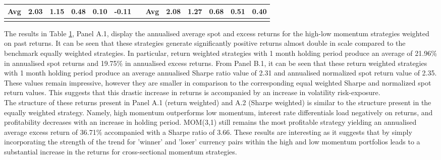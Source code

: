 \documentclass{article}
\begin{document}
\begin{table}[htbp!]
\begin{adjustwidth}{-2cm}{}
\begin{tabular}{ccccccccccccc}
\cmidrule{2-6}\cmidrule{9-13}    \textbf{Avg} & \multicolumn{1}{l}{2.03} & \multicolumn{1}{l}{1.15} & \multicolumn{1}{l}{0.48} & \multicolumn{1}{l}{0.10} & \multicolumn{1}{l}{-0.11} &       & \textbf{Avg} & \multicolumn{1}{l}{2.08} & \multicolumn{1}{l}{1.27} & \multicolumn{1}{l}{0.68} & \multicolumn{1}{l}{0.51} & \multicolumn{1}{l}{0.40} \\
    \midrule
          &       &       &       &       &       &       &       &       &       &       &       &  \\
    \end{tabular}%
    \end{adjustwidth}
  \label{WMR}%
\end{table}%

The results in Table \ref{WMR}, Panel A.1, display the annualised average spot and excess returns for the high-low momentum strategies weighted on past returns. It can be seen that these strategies generate significantly positive returns almost double in scale compared to the benchmark equally weighted strategies. In particular, return weighted strategies with 1 month holding period produce an average of 21.96\% in annualised spot returns and 19.75\% in annualised excess returns. From Panel B.1, it can be seen that these return weighted strategies with 1 month holding period produce an average annualised Sharpe ratio value of 2.31 and annualised normalized spot return value of 2.35. These values remain impressive, however they are smaller in comparison to the corresponding equal weighted Sharpe and normalized spot return values. This suggests that this drastic increase in returns is accompanied by an increase in volatility risk-exposure.\\

The structure of these returns present in Panel A.1 (return weighted) and A.2 (Sharpe weighted) is similar to the structure present in the equally weighted strategy. Namely, high momentum outperforms low momentum, interest rate differentials load negatively on returns, and profitability decreases with an increase in holding period. MOM(3,1) still remains the most profitable strategy yielding an annualised average excess return of 36.71\% accompanied with a Sharpe ratio of 3.66. These results are interesting as it suggests that by simply incorporating the strength of the trend for 'winner' and 'loser' currency pairs within the high and low momentum portfolios leads to a substantial increase in the returns for cross-sectional momentum strategies. \\
\end{document}
